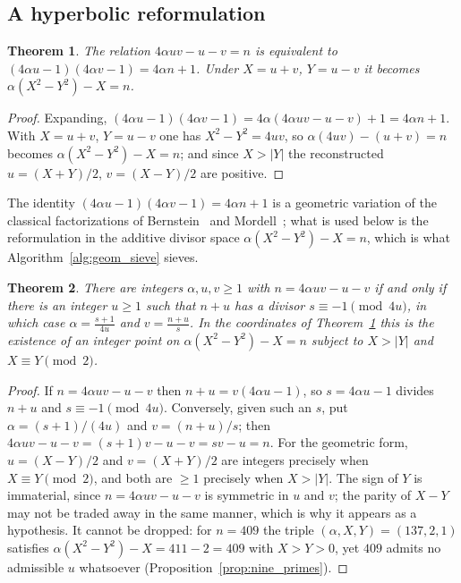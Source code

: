 \documentclass[11pt, a4paper]{article}
\theoremstyle{plain}
\newtheorem{theorem}{Theorem}[section]
\theoremstyle{definition}
\begin{document}
\subsection{A hyperbolic reformulation} \label{subsec:hyperbolic_surface}

\begin{theorem} \label{thm:4.8}
The relation $4\alpha u v - u - v = n$ is equivalent to $(4\alpha u - 1)(4\alpha v - 1) = 4\alpha n + 1$. Under $X = u + v$, $Y = u - v$ it becomes $\alpha(X^2 - Y^2) - X = n$.
\end{theorem}
\begin{proof}
Expanding, $(4\alpha u - 1)(4\alpha v - 1) = 4\alpha(4\alpha uv - u - v) + 1 = 4\alpha n + 1$. With $X = u+v$, $Y = u-v$ one has $X^2 - Y^2 = 4uv$, so $\alpha(4uv) - (u + v) = n$ becomes $\alpha(X^2 - Y^2) - X = n$; and since $X>|Y|$ the reconstructed $u = (X+Y)/2$, $v = (X-Y)/2$ are positive.
\end{proof}

The identity $(4\alpha u - 1)(4\alpha v - 1) = 4\alpha n + 1$ is a geometric variation of the classical factorizations of Bernstein~\cite{bernstein1962} and Mordell~\cite{mordell1969}; what is used below is the reformulation in the additive divisor space $\alpha(X^2 - Y^2) - X = n$, which is what Algorithm~\ref{alg:geom_sieve} sieves.

\begin{theorem} \label{thm:4.9}
There are integers $\alpha, u, v \ge 1$ with $n = 4\alpha u v - u - v$ if and only if there is an integer $u \ge 1$ such that $n+u$ has a divisor $s \equiv -1 \pmod{4u}$, in which case $\alpha = \frac{s+1}{4u}$ and $v=\frac{n+u}{s}$. In the coordinates of Theorem~\ref{thm:4.8} this is the existence of an integer point on $\alpha(X^{2}-Y^{2}) - X = n$ subject to $X > |Y|$ and $X \equiv Y \pmod 2$.
\end{theorem}
\begin{proof}
If $n = 4\alpha uv - u - v$ then $n+u = v(4\alpha u - 1)$, so $s = 4\alpha u - 1$ divides $n+u$ and $s\equiv-1\pmod{4u}$. Conversely, given such an $s$, put $\alpha = (s+1)/(4u)$ and $v = (n+u)/s$; then $4\alpha uv - u - v = (s+1)v - u - v = sv - u = n$. For the geometric form, $u = (X-Y)/2$ and $v = (X+Y)/2$ are integers precisely when $X \equiv Y \pmod 2$, and both are $\ge1$ precisely when $X > |Y|$. The sign of $Y$ is immaterial, since $n = 4\alpha uv - u - v$ is symmetric in $u$ and $v$; the parity of $X-Y$ may not be traded away in the same manner, which is why it appears as a hypothesis. It cannot be dropped: for $n = 409$ the triple $(\alpha, X, Y) = (137, 2, 1)$ satisfies $\alpha(X^{2}-Y^{2}) - X = 411 - 2 = 409$ with $X > Y > 0$, yet $409$ admits no admissible $u$ whatsoever (Proposition~\ref{prop:nine_primes}).
\end{proof}
\end{document}
